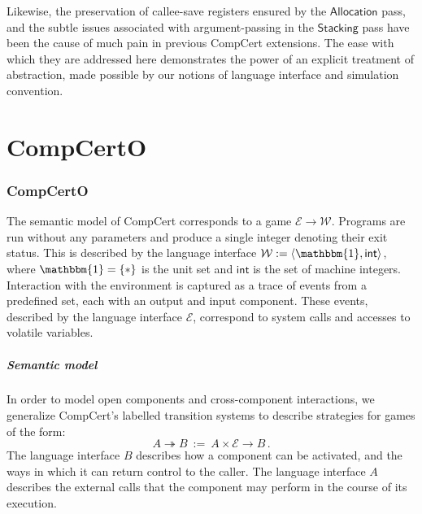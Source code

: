 \documentclass[draft,11pt]{report}
\newcommand{\kw}[1]{\ensuremath{ \mathsf{#1} }}
\begin{document}
Likewise, the preservation of callee-save registers
ensured by the \kw{Allocation} pass,
and the subtle issues associated with argument-passing
in the \kw{Stacking} pass
have been the cause of much pain
in previous CompCert extensions.
The ease with which they are addressed here
demonstrates the power of
an explicit treatment of abstraction,
made possible
by our notions of language interface and simulation convention.



\chapter{CompCertO} %

\subsection{CompCertO} \label{sec:mainideas:compcerto} %

The semantic model of CompCert corresponds to
a game $\mathcal{E} \rightarrow \mathcal{W}$.
Programs are run without any parameters
and produce a single integer denoting their exit status.
This is described by the language interface
$\mathcal{W} := \langle \mathbbm{1}, \kw{int} \rangle$,
where $\mathbbm{1} = \{ * \}$ is the unit set
and $\kw{int}$ is the set of machine integers.
Interaction with the environment
is captured as a trace of events from a predefined set,
each with an output and input component.
These events,
described by the language interface $\mathcal{E}$,
correspond to system calls and accesses to volatile variables.

\paragraph{Semantic model} %

In order to model open components and cross-component interactions,
we generalize CompCert's labelled transition systems
to describe strategies for games of the form:
\[ A \twoheadrightarrow B \: := \:
   A \times \mathcal{E} \rightarrow B \,. \]
The language interface $B$ describes how a component can be activated,
and the ways in which it can return control to the caller.
The language interface $A$ describes the external calls that the component
may perform in the course of its execution.
\end{document}
